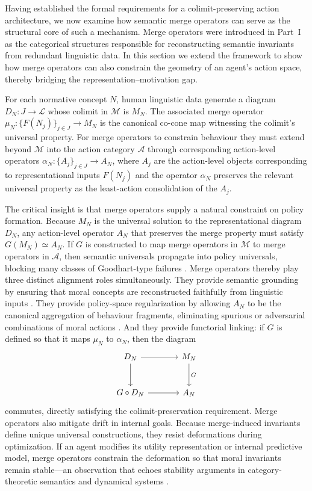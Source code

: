 \documentclass[12pt]{article}
\theoremstyle{definition}
\begin{document}
Having established the formal requirements for a colimit-preserving action
architecture, we now examine how semantic merge operators can serve as the
structural core of such a mechanism. Merge operators were introduced in Part~I
as the categorical structures responsible for reconstructing semantic invariants
from redundant linguistic data. In this section we extend the framework to show
how merge operators can also constrain the geometry of an agent's action space,
thereby bridging the representation--motivation gap.

For each normative concept $N$, human linguistic data generate a diagram $D_N :
J \to \mathcal{L}$ whose colimit in $\mathcal{M}$ is $M_N$. The associated
merge operator $\mu_N : \{F(N_j)\}_{j \in J} \to M_N$ is the canonical
co-cone map witnessing the colimit's universal property. For merge operators to
constrain behaviour they must extend beyond $\mathcal{M}$ into the action
category $\mathcal{A}$ through corresponding action-level operators $\alpha_N :
\{A_j\}_{j \in J} \to A_N$, where $A_j$ are the action-level objects
corresponding to representational inputs $F(N_j)$ and the operator $\alpha_N$
preserves the relevant universal property as the least-action consolidation of
the $A_j$.

The critical insight is that merge operators supply a natural constraint on
policy formation. Because $M_N$ is the universal solution to the
representational diagram $D_N$, any action-level operator $A_N$ that preserves
the merge property must satisfy $G(M_N) \simeq A_N$. If $G$ is constructed to
map merge operators in $\mathcal{M}$ to merge operators in $\mathcal{A}$, then
semantic universals propagate into policy universals, blocking many classes of
Goodhart-type failures \citep{manheim2018categorizing}. Merge operators thereby
play three distinct alignment roles simultaneously. They provide semantic
grounding by ensuring that moral concepts are reconstructed faithfully from
linguistic inputs \citep{Bybee2010}. They provide policy-space regularization by
allowing $A_N$ to be the canonical aggregation of behaviour fragments,
eliminating spurious or adversarial combinations of moral actions
\citep{gabriel2020}. And they provide functorial linking: if $G$ is defined so
that it maps $\mu_N$ to $\alpha_N$, then the diagram
\begin{equation}
\begin{tikzcd}[column sep=large, row sep=large]
D_N \arrow[r] \arrow[d]
& M_N \arrow[d,"G"] \\
G \circ D_N \arrow[r]
& A_N
\end{tikzcd}
\end{equation}
commutes, directly satisfying the colimit-preservation requirement. Merge
operators also mitigate drift in internal goals. Because merge-induced invariants
define unique universal constructions, they resist deformations during
optimization. If an agent modifies its utility representation or internal
predictive model, merge operators constrain the deformation so that moral
invariants remain stable---an observation that echoes stability arguments in
category-theoretic semantics \citep{jacobs2012} and dynamical systems
\citep{strogatz2018}.
\end{document}
